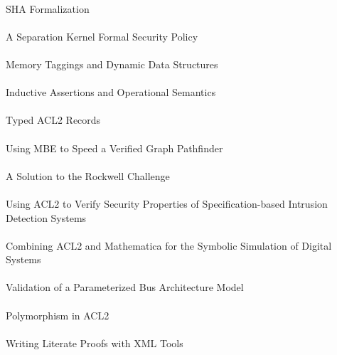 \documentclass{article}
\begin{document}
\cite{03-toma-sha} \\
SHA Formalization \\

\cite{03-greve-separation} \\
A Separation Kernel Formal Security Policy \\

\cite{03-moore-tagging} \\
Memory Taggings and Dynamic Data Structures \\

\cite{03-moore-assertions} \\
Inductive Assertions and Operational Semantics \\

\cite{03-greve-typed} \\
Typed ACL2 Records \\

\cite{03-greve-mbe} \\
Using MBE to Speed a Verified Graph Pathfinder \\

\cite{03-liu-rockwell} \\
A Solution to the Rockwell Challenge \\

\cite{03-song-security} \\
Using ACL2 to Verify Security Properties of Specification-based Intrusion Detection Systems \\

\cite{03-al-sammane-mathematica} \\
Combining ACL2 and Mathematica for the Symbolic Simulation of Digital Systems \\

\cite{03-schmaltz-bus} \\
Validation of a Parameterized Bus Architecture Model \\

\cite{03-gamboa-polymorphism} \\
Polymorphism in ACL2 \\

\cite{03-gamboa-literate} \\
Writing Literate Proofs with XML Tools \\
\end{document}
